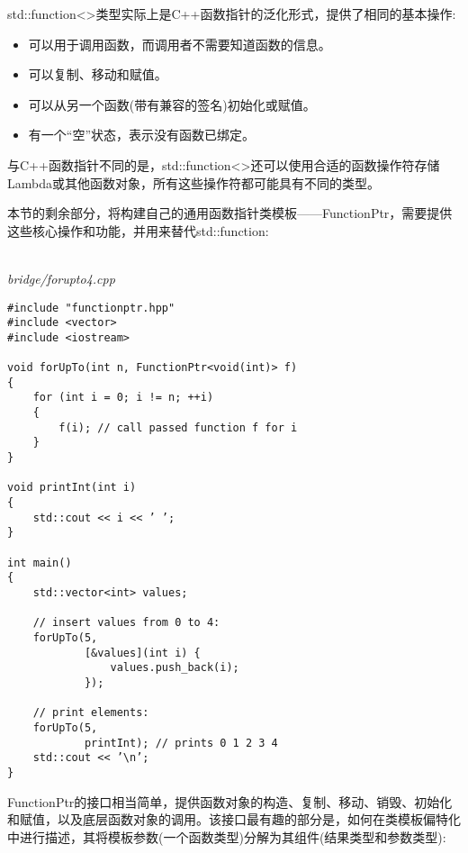 std::function<>类型实际上是C++函数指针的泛化形式，提供了相同的基本操作:

\begin{itemize}
\item 
可以用于调用函数，而调用者不需要知道函数的信息。

\item 
可以复制、移动和赋值。

\item 
可以从另一个函数(带有兼容的签名)初始化或赋值。

\item 
有一个“空”状态，表示没有函数已绑定。
\end{itemize}

与C++函数指针不同的是，std::function<>还可以使用合适的函数操作符存储Lambda或其他函数对象，所有这些操作符都可能具有不同的类型。

本节的剩余部分，将构建自己的通用函数指针类模板——FunctionPtr，需要提供这些核心操作和功能，并用来替代std::function:

\hspace*{\fill} \\ %
\noindent
\textit{bridge/forupto4.cpp}
\begin{lstlisting}[style=styleCXX]
#include "functionptr.hpp"
#include <vector>
#include <iostream>

void forUpTo(int n, FunctionPtr<void(int)> f)
{
	for (int i = 0; i != n; ++i)
	{
		f(i); // call passed function f for i
	}
}

void printInt(int i)
{
	std::cout << i << ’ ’;
}

int main()
{
	std::vector<int> values;
	
	// insert values from 0 to 4:
	forUpTo(5,
			[&values](int i) {
				values.push_back(i);
			});
		
	// print elements:
	forUpTo(5,
			printInt); // prints 0 1 2 3 4
	std::cout << ’\n’;
}
\end{lstlisting}

FunctionPtr的接口相当简单，提供函数对象的构造、复制、移动、销毁、初始化和赋值，以及底层函数对象的调用。该接口最有趣的部分是，如何在类模板偏特化中进行描述，其将模板参数(一个函数类型)分解为其组件(结果类型和参数类型):

